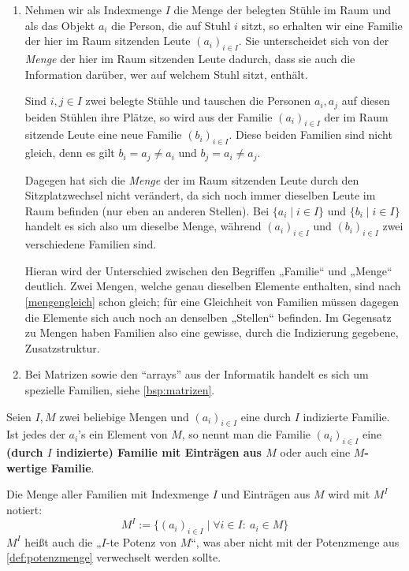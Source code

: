 \begin{bsp} \quad
    \begin{enumerate}
	\item Nehmen wir als Indexmenge $I$ die Menge der belegten Stühle im Raum und als das Objekt $a_i$ die Person, die auf Stuhl $i$ sitzt, so erhalten wir eine Familie der hier im Raum sitzenden Leute $(a_i)_{i\in I}$. Sie unterscheidet sich von der \textit{Menge} der hier im Raum sitzenden Leute dadurch, dass sie auch die Information darüber, wer auf welchem Stuhl sitzt, enthält.
	
	Sind $i,j\in I$ zwei belegte Stühle und tauschen die Personen $a_i,a_j$ auf diesen beiden Stühlen ihre Plätze, so wird aus der Familie $(a_i)_{i\in I}$ der im Raum sitzende Leute eine neue Familie $(b_i)_{i\in I}$. Diese beiden Familien sind nicht gleich, denn es gilt $b_i=a_j\neq a_i$ und $b_j=a_i\neq a_j$.
	
	Dagegen hat sich die \emph{Menge} der im Raum sitzenden Leute durch den Sitzplatzwechsel nicht verändert, da sich noch immer dieselben Leute im Raum befinden (nur eben an anderen Stellen). Bei $\{a_i\mid i\in I\}$ und $\{b_i \mid i\in I\}$ handelt es sich also um dieselbe Menge, während $(a_i)_{i\in I}$ und $(b_i)_{i\in I}$ zwei verschiedene Familien sind.
	
    Hieran wird der Unterschied zwischen den Begriffen „Familie“ und „Menge“ deutlich. Zwei Mengen, welche genau dieselben Elemente enthalten, sind nach \cref{mengengleich} schon gleich; für eine Gleichheit von Familien müssen dagegen die Elemente sich auch noch an denselben „Stellen“ befinden. Im Gegensatz zu Mengen haben Familien also eine gewisse, durch die Indizierung gegebene, Zusatzstruktur.
	\item Bei Matrizen sowie den ``arrays'' aus der Informatik handelt es sich um spezielle Familien, siehe \cref{bsp:matrizen}.
    \end{enumerate}
\end{bsp}


\begin{defin} \label{def:mengenpotenz}
    Seien $I,M$ zwei beliebige Mengen und $(a_i)_{i\in I}$ eine durch $I$ indizierte Familie. Ist jedes der $a_i$'s ein Element von $M$, so nennt man die Familie $(a_i)_{i\in I}$ eine \textbf{(durch $I$ indizierte) Familie mit Einträgen aus $M$} oder auch eine \textbf{$M$-wertige Familie}.
    
    Die Menge aller Familien mit Indexmenge $I$ und Einträgen aus $M$ wird mit $M^I$ notiert:
        \[ M^I := \{ (a_i)_{i\in I} \mid \forall i\in I:\ a_i \in M \} \]
    $M^I$ heißt auch die „$I$-te Potenz von $M$“, was aber nicht mit der Potenzmenge aus \cref{def:potenzmenge} verwechselt werden sollte.
\end{defin}


